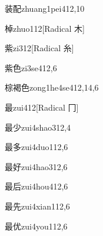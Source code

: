 \begin{verbete}{装配}{zhuang1pei4}{12,10}
\end{verbete}

\begin{verbete}{棹}{zhuo1}{12}[Radical 木]
\end{verbete}

\begin{verbete}{紫}{zi3}{12}[Radical 糸]
\end{verbete}

\begin{verbete}{紫色}{zi3se4}{12,6}
\end{verbete}

\begin{verbete}{棕褐色}{zong1he4se4}{12,14,6}
\end{verbete}

\begin{verbete}{最}{zui4}{12}[Radical 冂]
\end{verbete}

\begin{verbete}{最少}{zui4shao3}{12,4}
\end{verbete}

\begin{verbete}{最多}{zui4duo1}{12,6}
\end{verbete}

\begin{verbete}{最好}{zui4hao3}{12,6}
\end{verbete}

\begin{verbete}{最后}{zui4hou4}{12,6}
\end{verbete}

\begin{verbete}{最先}{zui4xian1}{12,6}
\end{verbete}

\begin{verbete}{最优}{zui4you1}{12,6}
\end{verbete}

